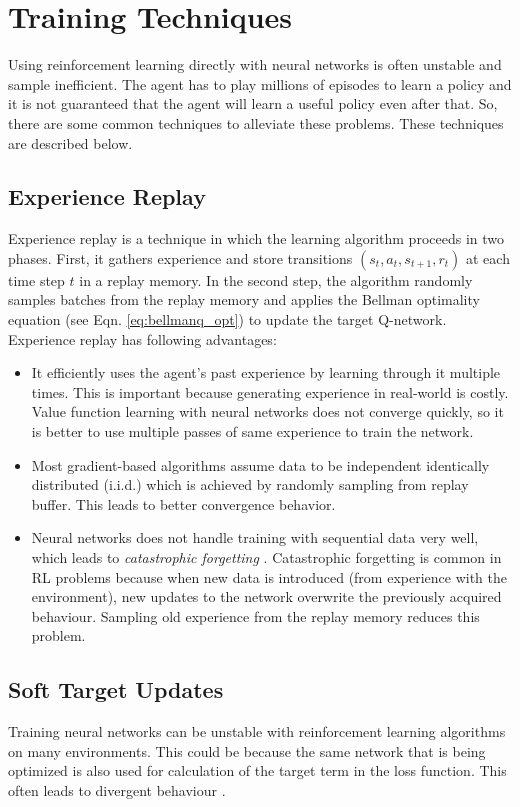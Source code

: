 \section{Training Techniques}
Using reinforcement learning directly with neural networks is often unstable and sample inefficient. The agent has to play millions of episodes to learn a policy and it is not guaranteed that the agent will learn a useful policy even after that. So, there are some common techniques to alleviate these problems. These techniques are described below.


\subsection{Experience Replay}
Experience replay \cite{Lin1992} is a technique in which the learning algorithm proceeds in two phases. First, it gathers experience and store transitions $(s_t, a_t, s_{t+1}, r_t)$ at each time step $t$ in a replay memory. In the second step, the algorithm randomly samples batches from the replay memory and applies the Bellman optimality equation (see Eqn. \ref{eq:bellmanq_opt}) to update the target Q-network. Experience replay has following advantages:

\begin{itemize}
\item It efficiently uses the agent's past experience by learning through it multiple times. This is important because generating experience in real-world is costly. Value function learning with neural networks does not converge quickly, so it is better to use multiple passes of same experience to train the network.
\item Most gradient-based algorithms assume data to be independent identically distributed (i.i.d.) which is achieved by randomly sampling from replay buffer. This leads to better convergence behavior.
\item Neural networks does not handle training with sequential data very well, which leads to \textit{catastrophic forgetting} \cite{French1999CatastrophicFI}. Catastrophic forgetting is common in RL problems because when new data is introduced (from experience with the environment), new updates to the network overwrite the previously acquired behaviour. Sampling old experience from the replay memory reduces this problem.
\end{itemize}

\subsection{Soft Target Updates}
Training neural networks can be unstable with reinforcement learning algorithms on many environments. This could be because the same network that is being optimized is also used for calculation of the target term in the loss function. This often leads to divergent behaviour \cite{ddpg} \cite{01_dqn}. 

